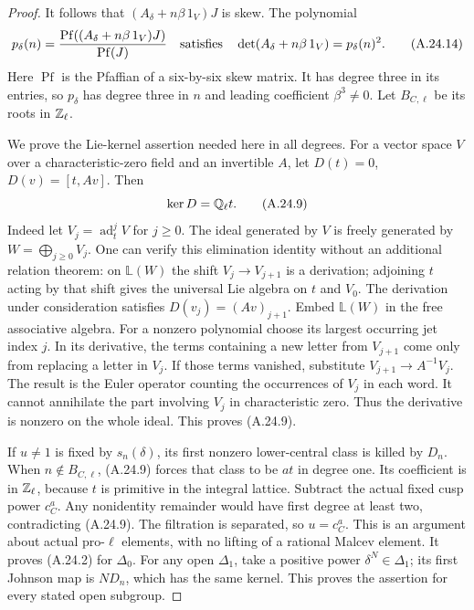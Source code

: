 \begin{proof}
It follows that $(A_\delta+n\beta\,1_V)J$ is skew.
The polynomial
\[
 p_\delta(n)=
 \frac{\operatorname{Pf}((A_\delta+n\beta\,1_V)J)}
      {\operatorname{Pf}(J)}
 \quad\hbox{satisfies}\quad
 \det(A_\delta+n\beta\,1_V)=p_\delta(n)^2.
                                                        \tag{A.24.14}
\]
Here $\operatorname{Pf}$ is the Pfaffian of a six-by-six
skew matrix. It has degree three in its entries, so
$p_\delta$ has degree three in $n$ and leading
coefficient $\beta^3\ne0$.
Let $B_{C,\ell}$ be its roots in $\mathbb Z_\ell$.

We prove the Lie-kernel assertion needed here in all
degrees. For a vector space $V$ over a characteristic-zero
field and an invertible $A$, let
$D(t)=0$, $D(v)=[t,Av]$. Then
\[
                    \ker D=\mathbb Q_\ell t.                  \tag{A.24.9}
\]
Indeed let $V_j=\operatorname{ad}_t^jV$ for $j\ge0$.
The ideal generated by $V$ is freely generated by
$W=\bigoplus_{j\ge0}V_j$. One can verify this elimination
identity without an additional relation theorem:
on $\mathbb L(W)$ the shift $V_j\to V_{j+1}$ is a
derivation; adjoining $t$ acting by that shift gives the
universal Lie algebra on $t$ and $V_0$.
The derivation under consideration satisfies
$D(v_j)=(Av)_{j+1}$.
Embed $\mathbb L(W)$ in the free associative algebra.
For a nonzero polynomial choose its largest occurring jet
index $j$. In its derivative, the terms containing a new
letter from $V_{j+1}$ come only from replacing a letter in
$V_j$. If those terms vanished, substitute
$V_{j+1}\to A^{-1}V_j$. The result is the Euler operator
counting the occurrences of $V_j$ in each word.
It cannot annihilate the part involving $V_j$ in
characteristic zero. Thus the derivative is nonzero on the
whole ideal. This proves (A.24.9).

If $u\ne1$ is fixed by $s_n(\delta)$, its first nonzero
lower-central class is killed by $D_n$. When
$n\notin B_{C,\ell}$, (A.24.9) forces that class to be
$a t$ in degree one. Its coefficient is in $\mathbb Z_\ell$,
because $t$ is primitive in the integral lattice.
Subtract the actual fixed cusp power $c_C^a$.
Any nonidentity remainder would have first degree at least
two, contradicting (A.24.9). The filtration is separated,
so $u=c_C^a$. This is an argument about actual pro-$\ell$
elements, with no lifting of a rational Malcev element.
It proves (A.24.2) for $\Delta_0$.
For any open $\Delta_1$, take a positive power
$\delta^N\in\Delta_1$; its first Johnson map is $ND_n$,
which has the same kernel. This proves the assertion for
every stated open subgroup.


\end{proof}
